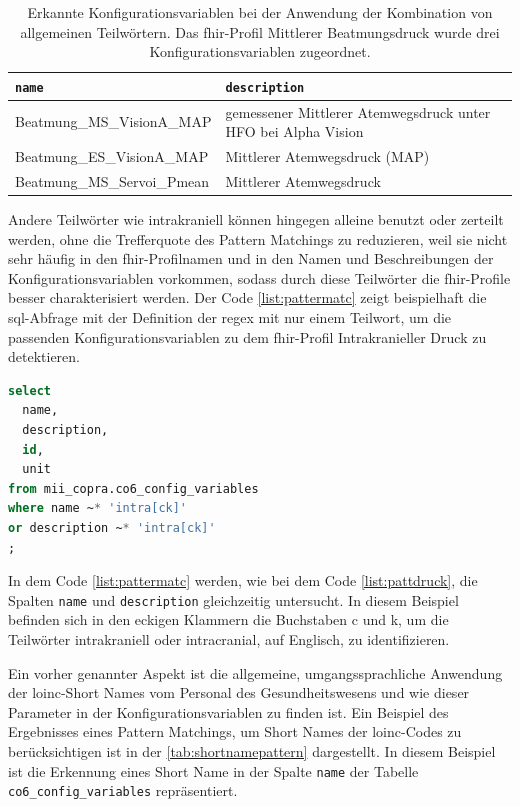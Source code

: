 \begin{longtable}{|l|p{5cm}|}
	\caption[Erkannte Konfigurationsvariablen durch eine \acs{regex} mit einer Kombination von allgemeinen Teilwörtern]{Erkannte Konfigurationsvariablen bei der Anwendung der Kombination von allgemeinen Teilwörtern. Das \ac{fhir}-Profil Mittlerer Beatmungsdruck wurde drei Konfigurationsvariablen zugeordnet.}
	\label{tab:mittatmdruck}
	\endfirsthead
		\hline
		\bfseries \texttt{name} & \bfseries \texttt{description} \\ \hline
		  Beatmung\_MS\_VisionA\_MAP & gemessener Mittlerer Atemwegsdruck unter HFO bei Alpha Vision \\ \hline
		  Beatmung\_ES\_VisionA\_MAP & Mittlerer Atemwegsdruck (MAP) \\ \hline                             
		  Beatmung\_MS\_Servoi\_Pmean & Mittlerer Atemwegsdruck \\ \hline   
\end{longtable}

Andere Teilwörter wie \glqq intrakraniell\grqq{} können hingegen alleine benutzt oder zerteilt werden, ohne die Trefferquote des Pattern Matchings zu reduzieren, weil sie nicht sehr häufig in den \ac{fhir}-Profilnamen und in den Namen und Beschreibungen der Konfigurationsvariablen vorkommen, sodass durch diese Teilwörter die \ac{fhir}-Profile besser charakterisiert werden. Der Code \ref{list:pattermatc} zeigt beispielhaft die \ac{sql}-Abfrage mit der Definition der \ac{regex} mit nur einem Teilwort, um die passenden Konfigurationsvariablen zu dem \ac{fhir}-Profil \glqq Intrakranieller Druck\grqq{} zu detektieren.

\begin{lstlisting}[language=SQL, caption={[SQL-Abfrage mit einem seltenen Teilwort] SQL-Abfrage mit einem seltenen Teilwort.}, captionpos=b, label=list:pattermatc]
select 
  name, 
  description, 
  id, 
  unit
from mii_copra.co6_config_variables 
where name ~* 'intra[ck]'
or description ~* 'intra[ck]'
;
\end{lstlisting}

In dem Code \ref{list:pattermatc} werden, wie bei dem Code \ref{list:pattdruck}, die Spalten \texttt{name} und \texttt{description} gleichzeitig untersucht. In diesem Beispiel befinden sich in den eckigen Klammern die Buchstaben \glqq c\grqq{} und \glqq k\grqq{}, um die Teilwörter \glqq intrakraniell\grqq{} oder \glqq intracranial\grqq{}, auf Englisch, zu identifizieren.

Ein vorher genannter Aspekt ist die allgemeine, umgangssprachliche Anwendung der \ac{loinc}-\glqq Short Names\grqq{} vom Personal des Gesundheitswesens und wie dieser Parameter in der Konfigurationsvariablen zu finden ist. Ein Beispiel des Ergebnisses eines Pattern Matchings, um \glqq Short Names\grqq{} der \ac{loinc}-Codes zu berücksichtigen ist in der \ref{tab:shortnamepattern} dargestellt. In diesem Beispiel ist die Erkennung eines \glqq Short Name\grqq{} in der Spalte \texttt{name} der Tabelle \texttt{co6\_config\_variables} repräsentiert.

